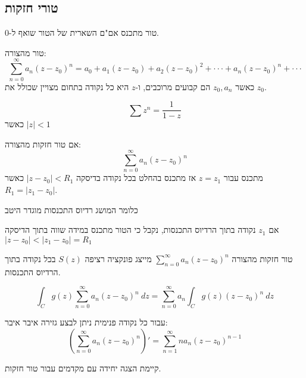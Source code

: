 \documentclass{tstextbook}
\begin{document}
\subsection{טורי חזקות}

\begin{proposition}
טור מתכנס אם"ם השארית של הטור שואף ל-0.

\end{proposition}
\begin{definition}
טור מהצורה:
$$\sum_{n=0}^{\infty}a_{n}(z-z_{0})^{n}=a_{0}+a_{1}(z-z_{0})+a_{2}(z-z_{0})^{2}+\cdot\cdot\cdot+a_{n}(z-z_{0})^{n}+\cdot\cdot\cdot$$
כאשר \(z_{0},a_{n}\) הם קבועים מרוכבים, ו-\(z\) היא כל נקודה בתחום מצויין שכולל את \(z_{0}\).

\end{definition}
\begin{proposition}
$$\sum z^{n}={\frac{1}{1-z}}$$
כאשר \(|z|<1\)

\end{proposition}
\begin{proposition}
אם טור חזקות מהצורה:
$$\sum_{n=0}^{\infty}a_{n}(z-z_{0})^{n}$$
מתכנס עבור \(z=z_{1}\) אז מתכנס בהחלט בכל נקודה בדיסקה \(|z-z_{0}|<R_{1}\) כאשר \(R_{1}=|z_{1}-z_{0}|\).

\end{proposition}
כלומר המושג רדיוס התכנסות מוגדר היטב

\begin{proposition}
אם \(z_{1}\) נקודה בתוך הרדיוס התכנסות, נקבל כי הטור מתכנס במידה שווה בתוך הדיסקה \(|z-z_{0}|<|z_{1}-z_{0}|=R_{1}\)

\end{proposition}
\begin{proposition}
טור חזקות מהצורה \(\sum_{n=0}^{\infty}a_{n}(z-z_{0})^{n}\) מייצג פונקציה רציפה \(S(z)\) בכל נקודה בתוך הרדיוס התכנסות.

\end{proposition}
\begin{proposition}
$$\int_{C}g(z)\sum_{n=0}^{\infty}a_{n}(z-z_{0})^{n}\ d z=\sum_{n=0}^{\infty}a_{n}\int_{C}g(z)(z-z_{0})^{n}\ d z$$

\end{proposition}
\begin{proposition}
עבור כל נקודה פנימית ניתן לבצע גזירה איבר איבר:
$$\left( \sum_{n=0}^{\infty}a_{n}(z-z_{0})^{n} \right)'=\sum_{n=1}^{\infty}n a_{n}(z-z_{0})^{n-1}$$

\end{proposition}
\begin{proposition}
קיימת הצגה יחידה עם מקדמים עבור טור חזקות.

\end{proposition}
\end{document}
